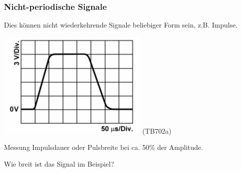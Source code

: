 \begin{frame}
  \frametitle{Nicht-periodische Signale}

  Dies können nicht wiederkehrende Signale beliebiger Form sein, z.B. Impulse.

  \begin{center}
    \includegraphics[width=\textwidth,height=0.5\textheight,keepaspectratio]{a11/TB702a.png}
    \tiny (TB702a)
  \end{center}

  Messung Impulsdauer oder Pulsbreite bei ca. 50\% der Amplitude.

  Wie breit ist das Signal im Beispiel?

\end{frame}

